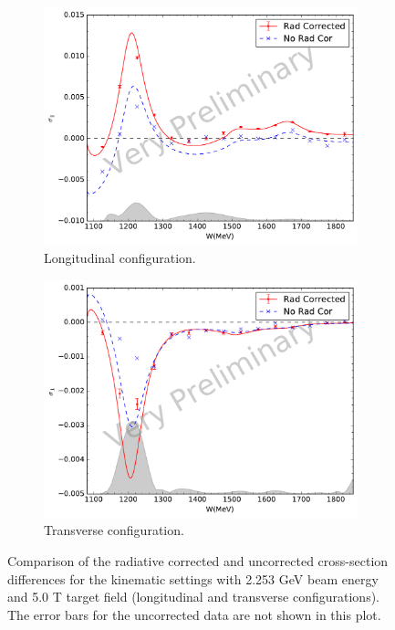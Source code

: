 \begin{figure}[p!]
  \centering
  \begin{subfigure}[t]{0.79\textwidth}
    \includegraphics[width=\textwidth]{figs/xsdiff-model-22535000.pdf}
    \caption{Longitudinal configuration. \label{C8S3F1a}}
  \end{subfigure}
  \begin{subfigure}[t]{0.79\textwidth}
    \includegraphics[width=\textwidth]{figs/xsdiff-model-22535090.pdf}
    \caption{Transverse configuration. \label{C8S3F1b}}
  \end{subfigure}
  \caption[Cross-section differences with $E=2.253$ GeV and $B=5.0$ T.]{Comparison of the radiative corrected and uncorrected cross-section differences for the kinematic settings with 2.253 GeV beam energy and 5.0 T target field (longitudinal and transverse configurations). The error bars for the uncorrected data are not shown in this plot. \label{C8S3F1}}
\end{figure}


